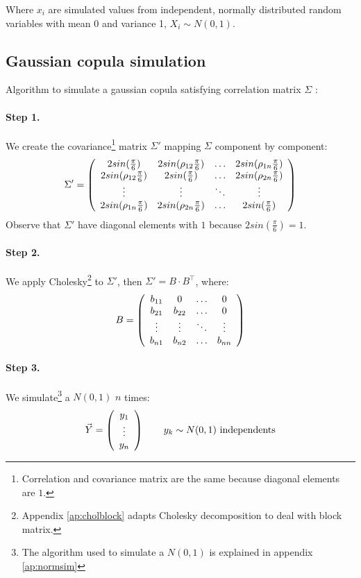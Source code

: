 \documentclass[a4paper,12pt,final]{article}
\begin{document}
Where $x_i$ are simulated values from independent, normally distributed 
random variables with mean 0 and variance 1, $X_i \sim N(0,1)$.

\subsection{Gaussian copula simulation}
\label{ap:gaussiancopu}
Algorithm to simulate a gaussian copula satisfying correlation matrix $\Sigma$ 
\cite{copu:wang} \cite{copu:pricing}:

\paragraph{Step 1.} We create the covariance\footnote{Correlation and covariance 
matrix are the same because diagonal elements are $1$.} matrix $\Sigma'$ mapping 
$\Sigma$ component by component:
\begin{displaymath}
\Sigma' = \left( 
\begin{array}{cccc}
2 sin(\frac{\pi}{6})           & 2 sin(\rho_{12} \frac{\pi}{6}) & \ldots & 2 sin(\rho_{1n} \frac{\pi}{6})\cr
2 sin(\rho_{12} \frac{\pi}{6}) & 2 sin(\frac{\pi}{6})           & \ldots & 2 sin(\rho_{2n} \frac{\pi}{6})\cr
\vdots                         & \vdots                         & \ddots  & \vdots   \cr
2 sin(\rho_{1n} \frac{\pi}{6}) & 2 sin(\rho_{2n} \frac{\pi}{6}) & \ldots & 2 sin(\frac{\pi}{6})
\end{array}
\right)
\end{displaymath}
Observe that $\Sigma'$ have diagonal elements with $1$ because $2 sin(\frac{\pi}{6}) = 1$.

\paragraph{Step 2.} We apply Cholesky\footnote{Appendix \ref{ap:cholblock} adapts Cholesky 
decomposition to deal with block matrix.} to $\Sigma'$, then $\Sigma' = B \cdot B^{\top}$, 
where:
\begin{displaymath}
B = 
\left(
\begin{array}{cccc}
b_{11}   & 0        & \ldots & 0       \cr
b_{21}   & b_{22}   & \ldots & 0       \cr
\vdots  & \vdots  & \ddots & \vdots \cr
b_{n1}   & b_{n2}   & \ldots & b_{nn}
\end{array}
\right)
\end{displaymath}

\paragraph{Step 3.} We simulate\footnote{The algorithm used to simulate a $N(0,1)$
is explained in appendix \ref{ap:normsim}} a $N(0,1)$ $n$ times:
\begin{displaymath}
\vec{Y} =
\left(
\begin{array}{c}
y_1 \cr
\vdots \cr
y_n
\end{array}
\right) 
\qquad y_k \sim N(0,1) \textrm{ independents}
\end{displaymath}
\end{document}
